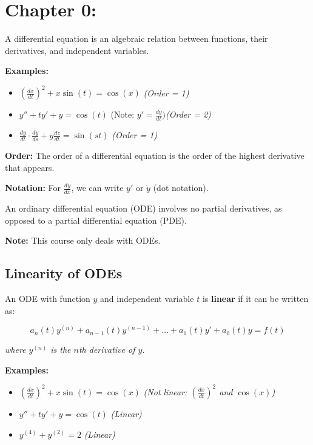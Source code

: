 \documentclass{article}
\begin{document}
\section*{Chapter 0:}

A differential equation is an algebraic relation between functions, their derivatives, and independent variables.

\pagebreak

\textbf{Examples:}
\begin{itemize}
    \item \( \left(\frac{dx}{dt}\right)^2 + x \sin(t) = \cos(x) \) \hfill \textit{(Order = 1)}
    \item \( y'' + ty' + y = \cos(t) \) \hfill (Note: \(y' = \frac{dy}{dt})\)\textit{(Order = 2)}
    \item \( \frac{dy}{dt} \cdot \frac{dy}{ds} + y \frac{dz}{dt} = \sin(st) \) \hfill \textit{(Order = 1)}
\end{itemize}

\textbf{Order:} The order of a differential equation is the order of the highest derivative that appears.

\textbf{Notation:} For \( \frac{dy}{dx} \), we can write \( y' \) or \( \dot{y} \) (dot notation).

An ordinary differential equation (ODE) involves no partial derivatives, as opposed to a partial differential equation (PDE).

\textbf{Note:} This course only deals with ODEs.

\subsection*{Linearity of ODEs}

An ODE with function \( y \) and independent variable \( t \) is \textbf{linear} if it can be written as:

\[
a_n(t)y^{(n)} + a_{n-1}(t)y^{(n-1)} + \dots + a_1(t)y' + a_0(t)y = f(t)
\]

\textit{where \( y^{(n)} \) is the \( n \)th derivative of \( y \).}

\textbf{Examples:}
\begin{itemize}
    \item \( \left(\frac{dx}{dt}\right)^2 + x \sin(t) = \cos(x) \) \hfill \textit{(Not linear: \( \left(\frac{dx}{dt}\right)^2 \) and \( \cos(x) \))}
    \item \( y'' + ty' + y = \cos(t) \) \hfill \textit{(Linear)}
    \item \( y^{(4)} + y^{(2)} = 2 \) \hfill \textit{(Linear)}
\end{itemize}
\end{document}
